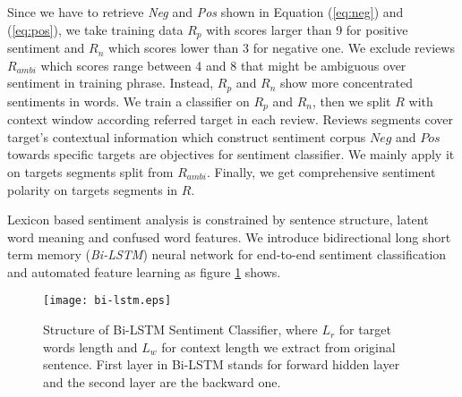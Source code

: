 \par Since we have to retrieve \emph{Neg} and \emph{Pos} shown in Equation (\ref{eq:neg}) and (\ref{eq:pos}), we take training data $R_p$ with scores larger than 9 for positive sentiment and $R_n$ which scores lower than 3 for negative one. We exclude reviews $R_{ambi}$ which scores range between 4 and 8 that might be ambiguous over sentiment in training phrase. Instead, $R_p$ and $R_n$ show more concentrated sentiments in words. We train a classifier on $R_p$ and $R_n$, then we split $R$ with context window according referred target in each review. Reviews segments cover target's contextual information which construct sentiment corpus $Neg$ and $Pos$ towards specific targets are objectives for sentiment classifier. We mainly apply it on targets segments split from $R_{ambi}$. Finally, we get comprehensive sentiment polarity on targets segments in $R$.

\par Lexicon based sentiment analysis is constrained by sentence structure, latent word meaning and confused word features. We introduce bidirectional long short term memory (\emph{Bi-LSTM}) neural network \cite{tang2015target-dependent,chen2017improving} for end-to-end sentiment classification and automated feature learning as figure \ref{fig:lstm} shows.

\begin{figure}[!htbp]
\centering
\texttt{[image: bi-lstm.eps]}
\caption{Structure of Bi-LSTM Sentiment Classifier, where $L_r$ for target words length and $L_w$ for context length we extract from original sentence. First layer in Bi-LSTM stands for forward hidden layer and the second layer are the backward one.}
\label{fig:lstm}
\end{figure}


